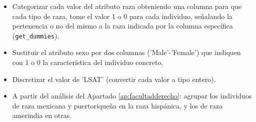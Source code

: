 \documentclass[oneside,openright,titlepage,numbers=noenddot,openany,headinclude,footinclude=true,
cleardoublepage=empty,abstractoff,BCOR=5mm,paper=a4,fontsize=12pt,main=spanish]{scrreprt}
\begin{document}
\begin{itemize}
    \item Categorizar cada valor del atributo raza obteniendo una columna para que cada tipo de raza, tome el valor 1 o 0 para cada individuo, señalando la pertenencia o no del mismo a la raza indicada por la columna específica (\texttt{get\_dummies}).
    \item Sustituir el atributo sexo por dos columnas ('Male'-'Female') que indiquen con 1 o 0 la característica del individuo concreto.
    \item Discretizar el valor de 'LSAT' (convertir cada valor a tipo entero).
    \item A partir del análisis del Apartado \ref{ap:facultadderecho}: agrupar los individuos de raza mexicana y puertoriqueña en la raza hispánica, y los de raza amerindia en otras.
\end{itemize}\
\end{document}
